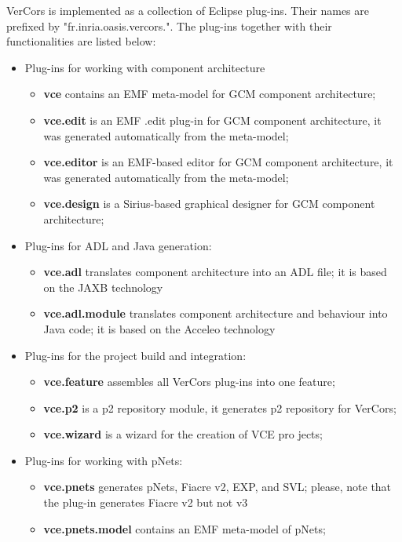\documentclass[12pt]{article}
\begin{document}
VerCors is implemented as a collection of Eclipse plug-ins. Their names are prefixed by "fr.inria.oasis.vercors.". The plug-ins together with their functionalities are listed below:
\begin{itemize}
\item
Plug-ins for working with component architecture 
\begin{itemize}
\item
\textbf{vce} contains an EMF meta-model for GCM component architecture;
\item
\textbf{vce.edit} is an EMF .edit plug-in for GCM component architecture, it was generated automatically from the meta-model;
\item
\textbf{vce.editor} is an EMF-based editor for GCM component architecture, it was generated automatically from the meta-model;
\item
\textbf{vce.design} is a Sirius-based graphical designer for GCM component architecture;
\end{itemize}

\item
Plug-ins for ADL and Java generation: 
\begin{itemize}
\item
\textbf{vce.adl} translates component architecture into an ADL file; it is based on the JAXB technology
\item
\textbf{vce.adl.module} translates component architecture and behaviour into Java code; it is based on the Acceleo technology
\end{itemize}

\item
Plug-ins for the  project build and integration:
\begin{itemize}
\item
\textbf{vce.feature} assembles all VerCors plug-ins into one feature;
\item
\textbf{vce.p2} is a p2 repository module, it generates p2 repository for VerCors;
\item
\textbf{vce.wizard} is a wizard for the creation of VCE pro
jects;
\end{itemize}

\item
Plug-ins for working with pNets:
\begin{itemize}
\item
\textbf{vce.pnets} generates pNets, Fiacre v2, EXP, and SVL; please, note that the plug-in generates Fiacre v2 but not v3
\item
\textbf{vce.pnets.model} contains an EMF meta-model of pNets;
\end{itemize}


\end{itemize}
\end{document}
